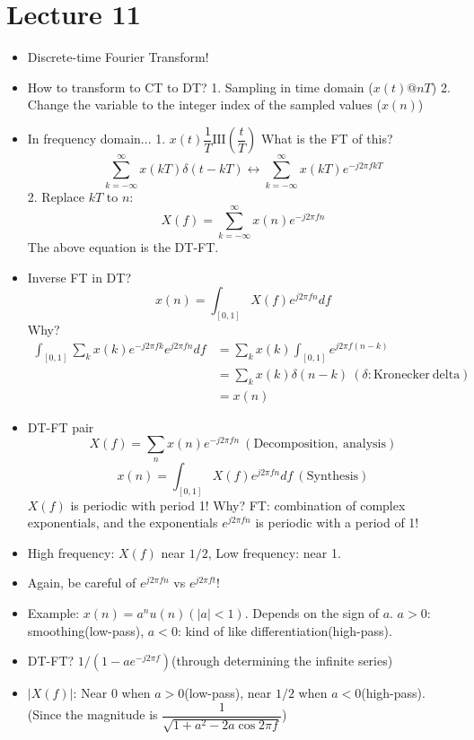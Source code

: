 \documentclass{article}
\begin{document}
\section{Lecture 11}
\begin{itemize}
    \item Discrete-time Fourier Transform!
    \item How to transform to CT to DT? 1. Sampling in time domain ($x(t)@nT$) 2. Change the variable to the integer index of the sampled values ($x(n)$)
    \item In frequency domain... 1. $x(t)\dfrac{1}{T}\mathrm{III}\left(\dfrac{t}{T}\right)$ What is the FT of this?
    \[\sum_{k=-\infty}^{\infty}{x(kT)\delta(t-kT)}\leftrightarrow\sum_{k=-\infty}^{\infty}{x(kT)e^{-j2\pi fkT}}\] 2. Replace $kT$ to $n$: \[X(f)=\sum_{k=-\infty}^{\infty}{x(n)e^{-j2\pi fn}}\]
    The above equation is the DT-FT.
    \item Inverse FT in DT?
    \[x(n)=\int_{[0,1]}{X(f)e^{j2\pi fn}df}\]
    Why?
    \begin{align*}
        \int_{[0,1]}{\sum_{k}{x(k)e^{-j2\pi fk}}e^{j2\pi fn}df}&=\sum_k{x(k)\int_{[0,1]}{e^{j2\pi f(n-k)}}}\\
        &=\sum_k{x(k)\delta(n-k)}\:(\delta:\mathrm{Kronecker\:delta})\\
        &=x(n)
    \end{align*}
    \item DT-FT pair
    \[X(f)=\sum_n{x(n)e^{-j2\pi fn}}\:(\mathrm{Decomposition,\:analysis})\]
    \[x(n)=\int_{[0,1]}{X(f)e^{j2\pi fn}df}\:(\mathrm{Synthesis})\]
    $X(f)$ is periodic with period 1! Why? FT: combination of complex exponentials, and the exponentials $e^{j2\pi fn}$ is periodic with a period of 1!
    \item High frequency: $X(f)$ near $1/2$, Low frequency: near 1.
    \item Again, be careful of $e^{j2\pi fn}$ vs $e^{j2\pi ft}$!
    \item Example: $x(n)=a^nu(n)(|a|<1)$. Depends on the sign of $a$. $a>0$: smoothing(low-pass), $a<0$: kind of like differentiation(high-pass).
    \item DT-FT? $1/(1-ae^{-j2\pi f})$(through determining the infinite series)
    \item $|X(f)|$: Near 0 when $a>0$(low-pass), near $1/2$ when $a<0$(high-pass). (Since the magnitude is $\dfrac{1}{\sqrt{1+a^2-2a\cos{2\pi f}}}$)
\end{itemize}
\end{document}
